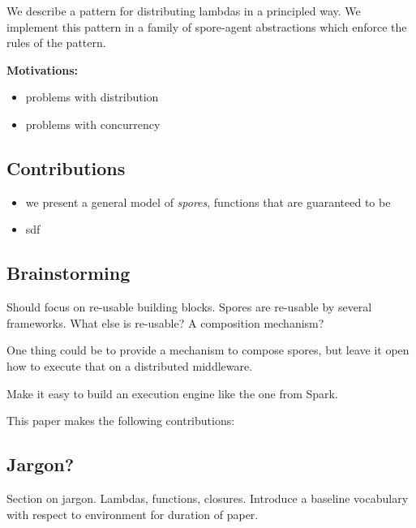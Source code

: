 \documentclass{llncs}
\begin{document}
We describe a pattern for distributing lambdas in a principled way. We
implement this pattern in a family of spore-agent abstractions which enforce
the rules of the pattern.

{\bf Motivations:}
\begin{itemize}
\item problems with distribution
\item problems with concurrency
\end{itemize}

\subsection{Contributions}

\begin{itemize}
\item we present a general model of \textit{spores}, functions that are guaranteed to be 
\item sdf
\end{itemize}

\subsection{Brainstorming}

Should focus on re-usable building blocks. Spores are re-usable by several
frameworks. What else is re-usable? A composition mechanism?

One thing could be to provide a mechanism to compose spores, but leave it open
how to execute that on a distributed middleware.

Make it easy to build an execution engine like the one from Spark.


This paper makes the following contributions:

\subsection{Jargon?}

Section on jargon. Lambdas, functions, closures. Introduce a baseline
vocabulary with respect to environment for duration of paper.


\end{document}
